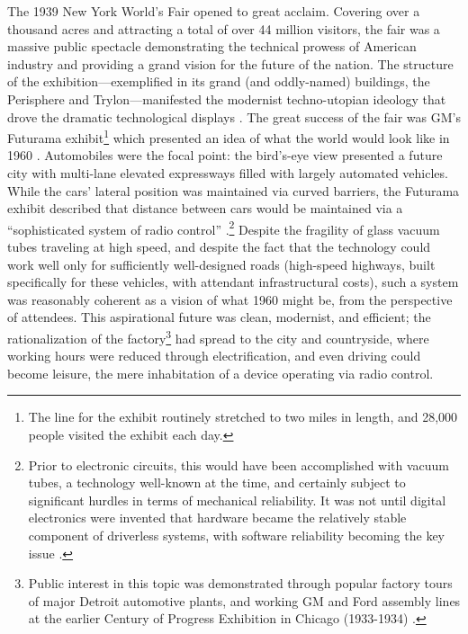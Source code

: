 The 1939 New York World's Fair opened to great acclaim. Covering over
a thousand acres and attracting a total of over 44 million visitors,
the fair was a massive public spectacle demonstrating the technical
prowess of American industry and providing a grand vision for the
future of the nation. The structure of the exhibition---exemplified in
its grand (and oddly-named) buildings, the Perisphere and
Trylon---manifested the modernist techno-utopian ideology that drove the
dramatic technological displays \cite[p. 371]{nyeElectrifying}. The
great success of the fair was 
GM's Futurama exhibit\footnote{The line for the exhibit routinely stretched to
two miles in length, and 28,000 people visited the exhibit each day.}
which presented an idea of what the world would look
like in 1960 \cite[p. 3-4]{wetmore}. Automobiles were the focal
point: the bird's-eye view presented a 
future city with multi-lane elevated expressways filled with largely
automated vehicles. While the cars' lateral position was maintained via
curved barriers, the Futurama exhibit described that distance
between cars would be maintained via a ``sophisticated system of radio
control'' \cite[p. 5]{wetmore}.\footnote{Prior to electronic circuits, this would have been
accomplished with vacuum tubes, a technology well-known at the time,
and certainly subject to significant hurdles in terms of mechanical
reliability. It was not until digital electronics were invented that
hardware became the relatively stable component of driverless systems,
with software reliability becoming the key issue \cite[p.
  15]{wetmore}.} Despite the 
fragility of glass vacuum tubes traveling at high speed, and despite the fact
that the technology could work well only for sufficiently
well-designed roads (high-speed highways, built specifically for these
vehicles, with attendant infrastructural costs), such a system was
reasonably coherent as a vision of what 1960 might be, from the
perspective of attendees. This aspirational future was clean,
modernist, and efficient; the rationalization of the
factory\footnote{Public interest in this topic was demonstrated through
  popular factory tours of major Detroit automotive 
  plants, and 
working GM and Ford assembly lines at the earlier Century of Progress
Exhibition in Chicago (1933-1934) \cite[p. 63-64]{nyeAmericas}.} had
spread to the city and 
countryside, where working hours were reduced through electrification,
and even driving could become leisure, the mere inhabitation of a
device operating via radio control.

